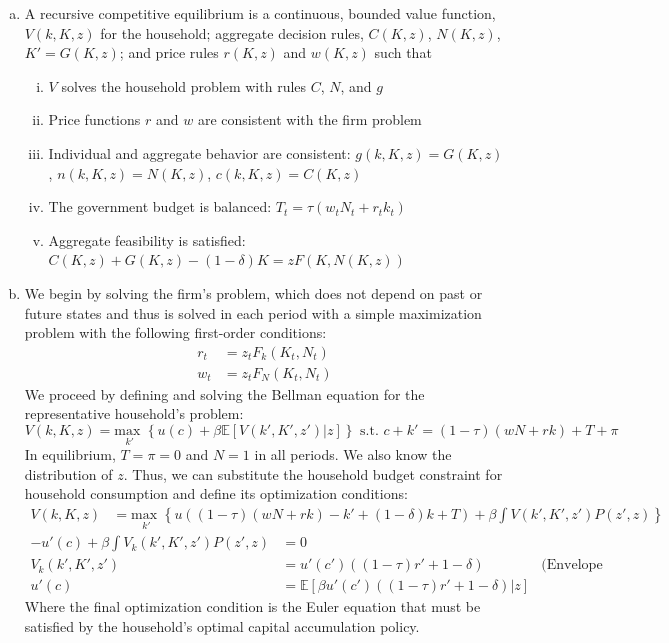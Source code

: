 \documentclass{article}
\newcommand{\usmax}[1]{\underset{#1}{\text{max }}}
\newcommand{\E}[1]{\mathbb{E}\left[#1\right]} %
\begin{document}
\begin{enumerate}[(a)]
	\item A recursive competitive equilibrium is a continuous, bounded value function, $V(k,K,z)$ for the household; aggregate decision rules, $C(K,z)$, $N(K,z)$, ${K'=G(K,z)}$; and price rules $r(K,z)$ and $w(K,z)$ such that
		\begin{enumerate}[(i)]
			\item $V$ solves the household problem with rules $C$, $N$, and $g$
			\item Price functions $r$ and $w$ are consistent with the firm problem 
			\item Individual and aggregate behavior are consistent: ${g(k,K,z)=G(K,z)}$, ${n(k,K,z)=N(K,z)}$, ${c(k,K,z)=C(K,z)}$
			\item The government budget is balanced: ${T_t = \tau(w_tN_t + r_tk_t)}$
			\item Aggregate feasibility is satisfied: ${C(K,z) + G(K,z) - (1-\delta)K = zF(K,N(K,z))}$
		\end{enumerate}
	
	\item We begin by solving the firm's problem, which does not depend on past or future states and thus is solved in each period with a simple maximization problem with the following first-order conditions:
		\begin{align*}
			r_t &= z_tF_k(K_t,N_t)	\\
			w_t &= z_tF_N(K_t,N_t)
		\end{align*}
		We proceed by defining and solving the Bellman equation for the representative household's problem:
		\[
			V(k,K,z) = \usmax{k'}\left\{u(c) + \beta\E{V(k',K',z')|z}\right\}\text{ s.t. } c + k' = (1-\tau)\left(wN + rk\right) + T + \pi
		\]
		In equilibrium, ${T=\pi=0}$ and ${N=1}$ in all periods. We also know the distribution of $z$. Thus, we can substitute the household budget constraint for household consumption and define its optimization conditions:
		\begin{align*}
			V(k,K,z) &= \usmax{k'}\left\{u((1-\tau)\left(wN + rk\right)-k'+(1-\delta)k+T) + \beta\int V(k',K',z') P(z',z) \right\}
		\end{align*}
		\begin{align*}
			-u'(c) + \beta\int V_k(k',K',z') P(z',z) &= 0					\\
			V_k(k',K',z') &= u'(c')((1-\tau)r'+1-\delta)&\text{(Envelope condition)}	\\
			u'(c) &= \E{\beta u'(c')((1-\tau)r'+1-\delta)|z}
		\end{align*}
		Where the final optimization condition is the Euler equation that must be satisfied by the household's optimal capital accumulation policy.
	

\end{enumerate}
\end{document}
